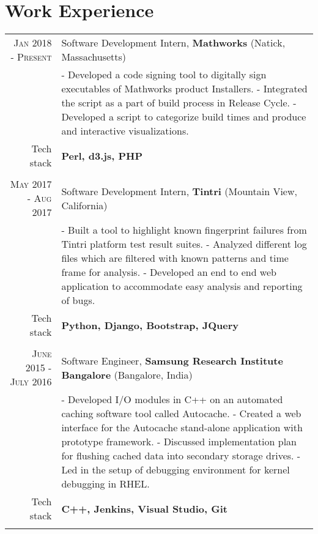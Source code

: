 \section {Work Experience}
\renewcommand{\arraystretch}{0.95}%
\begin{tabular}{r|p{14cm}}

\textsc {Jan 2018 - Present} & Software Development Intern, \textbf{Mathworks} (Natick, Massachusetts)\\
& \small{
- Developed a code signing tool to digitally sign executables of Mathworks product Installers. \newline
- Integrated the script as a part of build process in Release Cycle.\newline
- Developed a script to categorize build times and produce and interactive visualizations.} \\
\small{Tech stack} &\footnotesize{\textbf{Perl, d3.js, PHP}} \\
\multicolumn{2}{c}{} \\

\textsc {May 2017 - Aug 2017} & Software Development Intern, \textbf{Tintri} (Mountain View, California)\\
& \small{
- Built a tool to highlight known fingerprint failures from Tintri platform test result suites. \newline
- Analyzed different log files which are filtered with known patterns and time frame for analysis.\newline
- Developed an end to end web application to accommodate easy analysis and reporting of bugs.} \\
\small{Tech stack} &\footnotesize{\textbf{Python, Django, Bootstrap, JQuery}} \\
\multicolumn{2}{c}{} \\

\textsc {June 2015 - July 2016} & Software Engineer, \textbf{Samsung Research Institute Bangalore} (Bangalore, India) \\
& \small{
- Developed I/O modules in C++ on an automated caching software tool called Autocache.\newline
- Created a web interface for the Autocache stand-alone application with prototype framework.\newline
- Discussed implementation plan for flushing cached data into secondary storage drives.\newline
- Led in the setup of debugging environment for kernel debugging in RHEL.}\\
\small{Tech stack} &\footnotesize{\textbf{C++, Jenkins, Visual Studio, Git}} \\
\multicolumn{2}{c}{} \\



\end{tabular}
